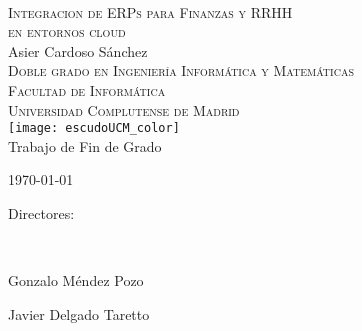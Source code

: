 \begin{titlepage}
	\begin{center}

		~\\[1.5cm]
		\textsc{\Large Integracion de ERPs para Finanzas y RRHH\\ en entornos cloud}\\[1.5cm]

		{\Large Asier Cardoso Sánchez}\\[1.5cm]
        
        \textsc{\normalsize Doble grado en Ingeniería Informática y Matemáticas \\ Facultad de Informática \\ Universidad Complutense de Madrid}\\[1.5cm]
		
		
		\texttt{[image: escudoUCM\_color]}\\[1.5cm]
        
        {\normalsize Trabajo de Fin de Grado}
		
		\vfill
		{\large \today}\\[1cm]
	\end{center}
    
    \begin{flushright}
        Directores:

        \ 
        
        Gonzalo Méndez Pozo
        
		Javier Delgado Taretto
    \end{flushright}
\end{titlepage}
